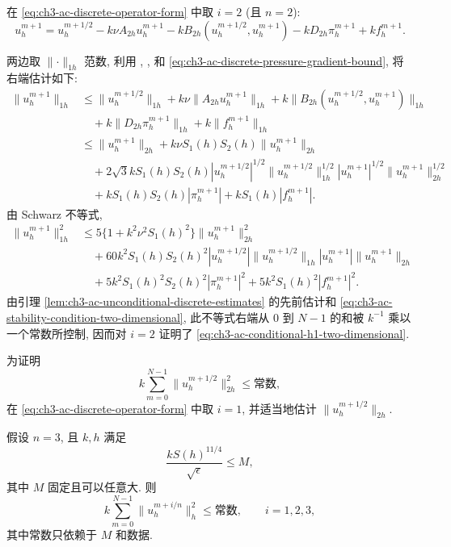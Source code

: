 \begin{Proof}
在 \eqref{eq:ch3-ac-discrete-operator-form} 中取 $i=2$ (且 $n=2$):
\[
u_h^{m+1}=u_h^{m+1/2}-k\nu A_{2h}u_h^{m+1}
-kB_{2h}(u_h^{m+1/2},u_h^{m+1})
-kD_{2h}\pi_h^{m+1}+kf_h^{m+1}.
\]

\hypertarget{chapter-03-page-320}{}
两边取 $\lVert\cdot\rVert_{1h}$ 范数, 利用 , ,  和 \eqref{eq:ch3-ac-discrete-pressure-gradient-bound}, 将右端估计如下:
\[
\begin{aligned}
\lVert u_h^{m+1}\rVert_{1h}
&\leq\lVert u_h^{m+1/2}\rVert_{1h}
+k\nu\lVert A_{2h}u_h^{m+1}\rVert_{1h}
+k\lVert B_{2h}(u_h^{m+1/2},u_h^{m+1})\rVert_{1h}\\
&\quad+k\lVert D_{2h}\pi_h^{m+1}\rVert_{1h}
+k\lVert f_h^{m+1}\rVert_{1h}\\
&\leq\lVert u_h^{m+1}\rVert_{2h}
+k\nu S_1(h)S_2(h)\lVert u_h^{m+1}\rVert_{2h}\\
&\quad+2\sqrt3kS_1(h)S_2(h)
|u_h^{m+1/2}|^{1/2}\lVert u_h^{m+1/2}\rVert_{1h}^{1/2}
|u_h^{m+1}|^{1/2}\lVert u_h^{m+1}\rVert_{2h}^{1/2}\\
&\quad+kS_1(h)S_2(h)|\pi_h^{m+1}|+kS_1(h)|f_h^{m+1}|.
\end{aligned}
\]
由 Schwarz 不等式,
\[
\begin{aligned}
\lVert u_h^{m+1}\rVert_{1h}^2
&\leq5\{1+k^2\nu^2S_1(h)^2\}\lVert u_h^{m+1}\rVert_{2h}^2\\
&\quad+60k^2S_1(h)S_2(h)^2
|u_h^{m+1/2}|\lVert u_h^{m+1/2}\rVert_{1h}
|u_h^{m+1}|\lVert u_h^{m+1}\rVert_{2h}\\
&\quad+5k^2S_1(h)^2S_2(h)^2|\pi_h^{m+1}|^2
+5k^2S_1(h)^2|f_h^{m+1}|^2.
\end{aligned}
\]
由引理 \ref{lem:ch3-ac-unconditional-discrete-estimates} 的先前估计和 \eqref{eq:ch3-ac-stability-condition-two-dimensional}, 此不等式右端从 $0$ 到 $N-1$ 的和被 $k^{-1}$ 乘以一个常数所控制, 因而对 $i=2$ 证明了 \eqref{eq:ch3-ac-conditional-h1-two-dimensional}.

为证明
\[
k\sum_{m=0}^{N-1}\lVert u_h^{m+1/2}\rVert_{2h}^2
\leq\text{常数},
\]
在 \eqref{eq:ch3-ac-discrete-operator-form} 中取 $i=1$, 并适当地估计 $\lVert u_h^{m+1/2}\rVert_{2h}$.
\end{Proof}

\begin{Lemma}
\label{lem:ch3-ac-conditional-estimate-three-dimensional}
假设 $n=3$, 且 $k,h$ 满足
\begin{equation}
\frac{kS(h)^{11/4}}{\sqrt\epsilon}\leq M,
\label{eq:ch3-ac-stability-condition-three-dimensional}
\end{equation}
其中 $M$ 固定且可以任意大. 则
\begin{equation}
k\sum_{m=0}^{N-1}\lVert u_h^{m+i/n}\rVert_h^2
\leq\text{常数},
\qquad i=1,2,3,
\label{eq:ch3-ac-conditional-h1-three-dimensional}
\end{equation}
其中常数只依赖于 $M$ 和数据.
\end{Lemma}

